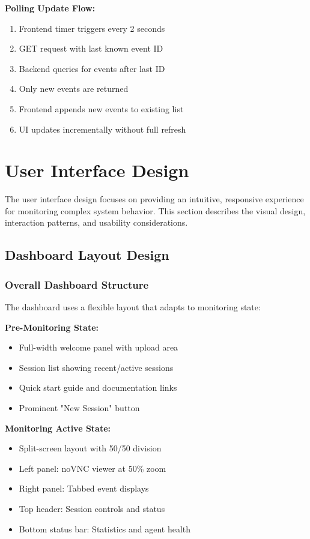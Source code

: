 \textbf{Polling Update Flow:}

\begin{enumerate}
    \item Frontend timer triggers every 2 seconds
    \item GET request with last known event ID
    \item Backend queries for events after last ID
    \item Only new events are returned
    \item Frontend appends new events to existing list
    \item UI updates incrementally without full refresh
\end{enumerate}

\section{User Interface Design}

The user interface design focuses on providing an intuitive, responsive experience for monitoring complex system behavior. This section describes the visual design, interaction patterns, and usability considerations.

\subsection{Dashboard Layout Design}

\subsubsection{Overall Dashboard Structure}

The dashboard uses a flexible layout that adapts to monitoring state:

\textbf{Pre-Monitoring State:}
\begin{itemize}
    \item Full-width welcome panel with upload area
    \item Session list showing recent/active sessions
    \item Quick start guide and documentation links
    \item Prominent "New Session" button
\end{itemize}

\textbf{Monitoring Active State:}
\begin{itemize}
    \item Split-screen layout with 50/50 division
    \item Left panel: noVNC viewer at 50\% zoom
    \item Right panel: Tabbed event displays
    \item Top header: Session controls and status
    \item Bottom status bar: Statistics and agent health
\end{itemize}

